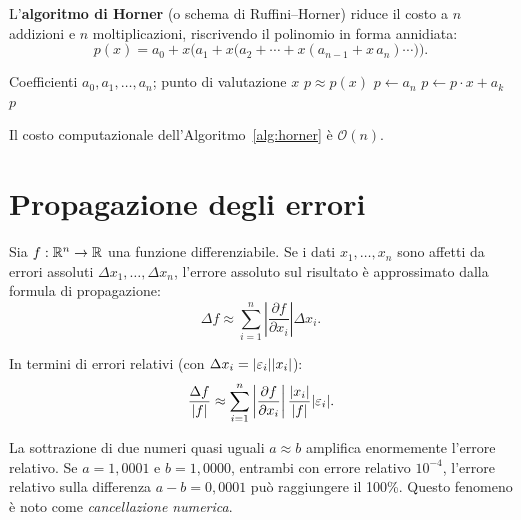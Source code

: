 L'\textbf{algoritmo di Horner} (o schema di Ruffini–Horner) riduce il costo a $n$
addizioni e $n$ moltiplicazioni, riscrivendo il polinomio in forma annidiata:
\begin{equation}
  p(x) = a_0 + x\bigl(a_1 + x\bigl(a_2 + \cdots + x(a_{n-1} + x\, a_n)\cdots\bigr)\bigr).
  \label{eq:horner}
\end{equation}

\begin{algorithm}[htbp]
  \caption{Algoritmo di Horner per la valutazione di polinomi}
  \label{alg:horner}
  \begin{algorithmic}[1]
    \Require Coefficienti $a_0, a_1, \ldots, a_n$; punto di valutazione $x$
    \Ensure $p \approx p(x)$
    \State $p \gets a_n$
      \State $p \gets p \cdot x + a_k$
    \EndFor
    \State \Return $p$
  \end{algorithmic}
\end{algorithm}

Il costo computazionale dell'Algoritmo~\ref{alg:horner} è $\mathcal{O}(n)$.

\section{Propagazione degli errori}
\label{sec:propagazione}

Sia $f : \mathbb{R}^n \to \mathbb{R}$ una funzione differenziabile. Se i dati $x_1,\ldots,x_n$ sono
affetti da errori assoluti $\Delta x_1,\ldots,\Delta x_n$, l'errore assoluto sul
risultato è approssimato dalla formula di propagazione:
\begin{equation}
  \Delta f \approx \sum_{i=1}^{n} \left|\frac{\partial f}{\partial x_i}\right| \Delta x_i.
  \label{eq:propagazione}
\end{equation}

In termini di errori relativi (con $\Delta x_i = |\varepsilon_i| |x_i|$):
\begin{equation}
  \frac{\Delta f}{|f|} \approx \sum_{i=1}^{n} \left|\frac{\partial f}{\partial x_i}\right|
  \frac{|x_i|}{|f|} |\varepsilon_i|.
  \label{eq:propagazione_rel}
\end{equation}

\begin{example}
La sottrazione di due numeri quasi uguali $a \approx b$ amplifica enormemente l'errore
relativo. Se $a = 1{,}0001$ e $b = 1{,}0000$, entrambi con errore relativo $10^{-4}$,
l'errore relativo sulla differenza $a - b = 0{,}0001$ può raggiungere il 100\%.
Questo fenomeno è noto come \emph{cancellazione numerica}.
\end{example}

